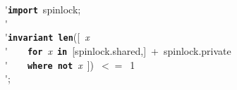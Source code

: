 \'\>\texttt{\textbf{import}}~spinlock;\\

\'\>\\

\'\>\texttt{\textbf{invariant}}~\texttt{\textbf{len}}([~\textit{x}\\

\'\>~~~~\texttt{\textbf{for}}~\textit{x}~\texttt{\textbf{in}}~[spinlock.shared,]~+~spinlock.private\\

\'\>~~~~\texttt{\textbf{where}}~\texttt{\textbf{not}}~\textit{x}~])~$<=$~1\\

\'\>;